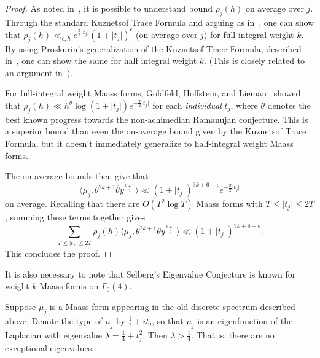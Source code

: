 \begin{proof}
  As noted in~\cite{hulseCountingSquare}, it is possible to understand bound $\rho_j(h)$
  on average over $j$.
  Through the standard Kuznetsof Trace Formula and arguing as in~\cite[Section
  4]{HoffsteinHulse13}, one can show that $\rho_j(h) \ll_{\epsilon, h}
  e^{\frac{\pi}{2}\lvert t_j \rvert}(1 + \lvert t_j \rvert)^\epsilon$ (on average over
  $j$) for full integral weight $k$.
  By using Proskurin's generalization of the Kuznetsof Trace Formula, described
  in~\cite{Duke88}, one can show the same for half integral weight $k$.
  (This is closely related to an argument in~\cite{hulseCountingSquare}).


  \begin{remark}
    For full-integral weight Maass forms, Goldfeld, Hoffstein, and
    Lieman~\cite{goldfeld1994appendix} showed that $\rho_j(h) \ll h^\theta \log(1 + \lvert
    t_j \rvert)  e^{-\frac{\pi}{2} \lvert t_j \rvert}$ for each \emph{individual} $t_j$,
    where $\theta$ denotes the best known progress towards the non-achimedian Ramanujan
    conjecture.
    This is a superior bound than even the on-average bound given by the Kuznetsof Trace
    Formula, but it doesn't immediately generalize to half-integral weight Maass forms.
  \end{remark}


The on-average bounds then give that
  \begin{equation}
    \langle \mu_j, \theta^{2k+1} \overline{\theta} y^{\frac{k+1}{2}} \rangle \ll (1 +
    \lvert t_j \rvert)^{3k + 6 + \epsilon} e^{-\frac{\pi}{2} \lvert t_j \rvert}
  \end{equation}
  on average.
  Recalling that there are $O(T^2 \log T)$ Maass forms with $T \leq \lvert t_j \rvert \leq
  2T$, summing these terms together gives
  \begin{equation}
    \sum_{T \leq \lvert t_j \rvert \leq 2T} \rho_j(h) \langle \mu_j, \theta^{2k+1}
    \overline{\theta} y^{\frac{k+1}{2}} \rangle \ll (1 + \lvert t_j \rvert)^{3k + 8 +
    \epsilon}.
  \end{equation}
  This concludes the proof.
\end{proof}



It is also necessary to note that Selberg's Eigenvalue Conjecture is known for weight $k$
Maass forms on $\Gamma_0(4)$.


\begin{lemma}
  Suppose $\mu_j$ is a Maass form appearing in the old discrete spectrum described above.
  Denote the type of $\mu_j$ by $\frac{1}{2} + it_j$, so that $\mu_j$ is an eigenfunction
  of the Laplacian with eigenvalue $\lambda = \frac{1}{4} + t_j^2$.
  Then $\lambda > \frac{1}{4}$.
  That is, there are no exceptional eigenvalues.
\end{lemma}


